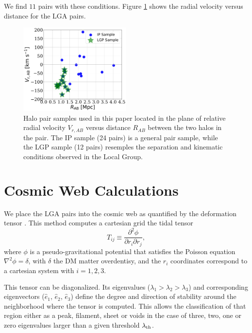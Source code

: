 \documentclass[a4paper,fleqn,usenatbib]{mnras}
\begin{document}
We find $11$ pairs with these conditions.
Figure \ref{fig:samples} shows the radial velocity versus distance for
the LGA pairs.

\begin{figure}
\centering
\includegraphics[width=0.5\textwidth]{v_r_pairs.pdf}
\caption{Halo pair samples used in this paper located in the
  plane of relative radial velocity $V_{r,AB}$ versus 
  distance $R_{AB}$ between the two halos in the pair.
  The IP sample (24 pairs) is a general pair sample, while the LGP
  sample (12 pairs) resemples the separation and kinematic
  conditions observed in the Local Group.} 
\label{fig:samples}
\end{figure}


\section{Cosmic Web Calculations}
\label{sec:CosmicWeb}

We place the LGA pairs into the cosmic web as quantified by the
deformation tensor  
\citep{2007MNRAS.375..489H,2009MNRAS.396.1815F}.
This method computes a cartesian grid the tidal tensor 
\begin{equation}
T_{ij} \equiv \frac{\partial^2\phi}{\partial r_i \partial r_j},
\end{equation}
%
where $\phi$ is a pseudo-gravitational potential that satisfies the
Poisson equation $\nabla^2\phi=\delta$, with $\delta$ the DM matter
overdentisy, and the $r_i$ coordinates correspond to a cartesian
system with $i=1,2,3$.   

This tensor can be diagonalized.
Its eigenvalues ($\lambda_1 > \lambda_2 > \lambda_3$) and
corresponding eigenvectors ($\hat{e}_1$, $\hat{e}_2$, $\hat{e}_3$)
define the degree and direction of stability around the neighborhood
where the tensor is computed. 
This allows the classification of that region either as a peak,
filament, sheet or voids in the case of three, two, one or zero
eigenvalues larger than a given threshold $\lambda_{\rm th}$.
\end{document}
